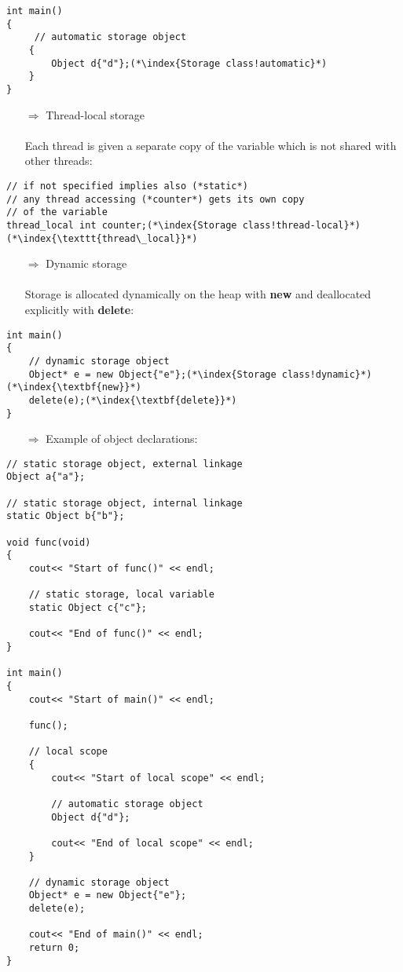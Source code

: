 \documentclass[10pt]{book}
\begin{document}
\begin{lstlisting}
int main()
{
     // automatic storage object
    {
        Object d{"d"};(*\index{Storage class!automatic}*)
    }   
}
\end{lstlisting}
\begin{enumerate}
\item[$\Rightarrow$] Thread-local storage\\ \\ Each thread is given a separate copy of the variable which is not shared with other threads:
\end{enumerate}
\begin{lstlisting}
// if not specified implies also (*static*)
// any thread accessing (*counter*) gets its own copy
// of the variable
thread_local int counter;(*\index{Storage class!thread-local}*)(*\index{\texttt{thread\_local}}*)
\end{lstlisting}
\begin{enumerate}
\item[$\Rightarrow$] Dynamic storage\\ \\ Storage is allocated dynamically on the heap with \textbf{new} and deallocated explicitly with \textbf{delete}:
\end{enumerate}
\begin{lstlisting}
int main()
{
    // dynamic storage object
    Object* e = new Object{"e"};(*\index{Storage class!dynamic}*)(*\index{\textbf{new}}*)
    delete(e);(*\index{\textbf{delete}}*)
}
\end{lstlisting}
\begin{enumerate}
\item[$\Rightarrow$] Example of object declarations:
\end{enumerate}
\begin{lstlisting}
// static storage object, external linkage
Object a{"a"};

// static storage object, internal linkage
static Object b{"b"};

void func(void)
{
    cout<< "Start of func()" << endl;
    
    // static storage, local variable
    static Object c{"c"};
    
    cout<< "End of func()" << endl;
}

int main()
{
    cout<< "Start of main()" << endl;
    
    func();
    
    // local scope
    {
        cout<< "Start of local scope" << endl;
        
        // automatic storage object
        Object d{"d"};
        
        cout<< "End of local scope" << endl;
    }
    
    // dynamic storage object
    Object* e = new Object{"e"};
    delete(e);
    
    cout<< "End of main()" << endl;
    return 0;
}
\end{lstlisting}
\end{document}
